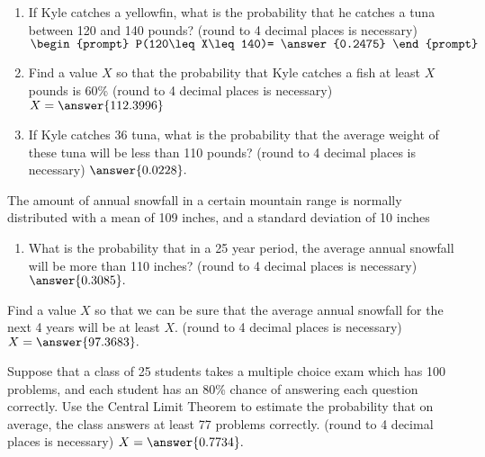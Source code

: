 \documentclass{ximera}
\begin{document}
\begin{enumerate}
\begin{problem}
\begin{enumerate}
\item If Kyle catches a yellowfin, what is the probability that he catches a tuna between 120 and 140 pounds? (round to 4 decimal places is necessary) $\begin{prompt}
    P(120\leq X\leq 140)= \answer{0.2475}
  \end{prompt}$ 
  \item  Find a value $X$ so that the probability that Kyle catches a fish at least $X$ pounds is 60\% (round to 4 decimal places is necessary) $X=\answer{112.3996}$
  \item If Kyle catches 36 tuna, what is the probability that the average weight of these tuna will be less than 110 pounds? (round to 4 decimal places is necessary) $\answer{0.0228}.$

\end{enumerate}
\end{problem}


\begin{problem}
The amount of annual snowfall in a certain mountain range is normally distributed with a mean of 109 inches, and a standard deviation of 10 inches
\begin{enumerate}
\item What is the probability that in a 25 year period, the average annual snowfall will be more than 110 inches? (round to 4 decimal places is necessary) $\answer{0.3085}.$
\end{enumerate}

\item Find a value $X$ so that we can be sure that the average annual snowfall for the next 4 years will be at least $X$. (round to 4 decimal places is necessary) $X=\answer{97.3683}.$

\end{problem}

\begin{problem}
Suppose that a class of 25 students takes a multiple choice exam which has 100 problems, and each student has an 80\% chance of answering each question correctly.  Use the Central Limit Theorem to estimate the probability that on average, the class answers at least 77 problems correctly. (round to 4 decimal places is necessary) $X=\answer{0.7734}.$



\end{problem}




\end{enumerate}





 
 
 
 
      
\end{document}
